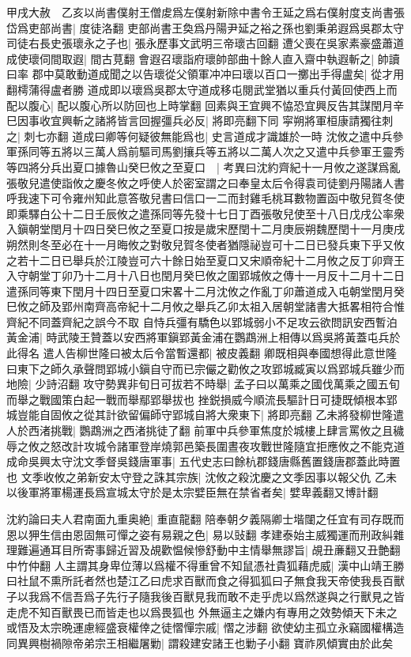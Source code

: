 甲戌大赦　乙亥以尚書僕射王僧䖍爲左僕射新除中書令王延之爲右僕射度支尚書張岱爲吏部尚書|{
	度徒洛翻}
吏部尚書王奐爲丹陽尹延之裕之孫也劉秉弟遐爲吳郡太守司徒右長史張瓌永之子也|{
	張永歷事文武明三帝瓌古回翻}
遭父喪在吳家素豪盛蕭道成使瓌伺間取遐|{
	間古莧翻}
會遐召瓌詣府瓌帥部曲十餘人直入齋中執遐斬之|{
	帥讀曰率}
郡中莫敢動道成聞之以告瓌從父領軍冲冲曰瓌以百口一擲出手得盧矣|{
	從才用翻樗蒲得盧者勝}
道成即以瓌爲吳郡太守道成移屯閱武堂猶以重兵付黃回使西上而配以腹心|{
	配以腹心所以防回也上時掌翻}
回素與王宜興不恊恐宜興反告其謀閏月辛巳因事收宜興斬之諸將皆言回握彊兵必反|{
	將即亮翻下同}
寜朔將軍桓康請獨往刺之|{
	刺七亦翻}
道成曰卿等何疑彼無能爲也|{
	史言道成才識雄於一時}
沈攸之遣中兵參軍孫同等五將以三萬人爲前驅司馬劉攘兵等五將以二萬人次之又遣中兵參軍王靈秀等四將分兵出夏口據魯山癸巳攸之至夏口　|{
	考異曰沈約齊紀十一月攸之遂謀爲亂張敬兒遣使詣攸之慶冬攸之呼使人於密室謂之曰奉皇太后令得袁司徒劉丹陽諸人書呼我速下可令雍州知此意答敬兒書曰信口一二而封雞毛桃耳數物置函中敬兒賀冬使即乘驛白公十二日壬辰攸之遣孫同等先發十七日丁酉張敬兒使至十八日戊戌公率衆入鎭朝堂閏月十四日癸巳攸之至夏口按是歲宋歷閏十二月庚辰朔魏歷閏十一月庚戌朔然則冬至必在十一月晦攸之對敬兒賀冬使者猶隱祕豈可十二日已發兵東下乎又攸之若十二日已舉兵於江陵豈可六十餘日始至夏口又宋順帝紀十二月攸之反丁卯齊王入守朝堂丁卯乃十二月十八日也閏月癸巳攸之圍郢城攸之傳十一月反十二月十二日遣孫同等東下閏月十四日至夏口宋畧十二月沈攸之作亂丁卯蕭道成入屯朝堂閏月癸巳攸之師及郢州南齊高帝紀十二月攸之舉兵乙卯太祖入居朝堂諸書大抵畧相符合惟齊紀不同蓋齊紀之誤今不取}
自恃兵彊有驕色以郢城弱小不足攻云欲問訊安西暫泊黃金浦|{
	時武陵王贊蓋以安西將軍鎭郢黃金浦在鸚鵡洲上相傳以爲吳將黃蓋屯兵於此得名}
遣人告柳世隆曰被太后令當暫還都|{
	被皮義翻}
卿既相與奉國想得此意世隆曰東下之師久承聲問郢城小鎭自守而已宗儼之勸攸之攻郢城臧寅以爲郢城兵雖少而地險|{
	少詩沼翻}
攻守勢異非旬日可拔若不時舉|{
	孟子曰以萬乘之國伐萬乘之國五旬而舉之戰國策白起一戰而舉鄢郢舉拔也}
挫鋭損威今順流長驅計日可捷既傾根本郢城豈能自固攸之從其計欲留偏師守郢城自將大衆東下|{
	將即亮翻}
乙未將發柳世隆遣人於西渚挑戰|{
	鸚鵡洲之西渚挑徒了翻}
前軍中兵參軍焦度於城樓上肆言罵攸之且穢辱之攸之怒改計攻城令諸軍登岸燒郭邑築長圍晝夜攻戰世隆隨宜拒應攸之不能克道成命吳興太守沈文季督吳錢唐軍事|{
	五代史志曰餘杭郡錢唐縣舊置錢唐郡蓋此時置也}
文季收攸之弟新安太守登之誅其宗族|{
	沈攸之殺沈慶之文季因事以報父仇}
乙未以後軍將軍楊運長爲宣城太守於是太宗嬖臣無在禁省者矣|{
	嬖卑義翻又博計翻}


沈約論曰夫人君南面九重奥絶|{
	重直龍翻}
陪奉朝夕義隔卿士堦闥之任宜有司存既而恩以狎生信由恩固無可憚之姿有易親之色|{
	易以䜴翻}
孝建泰始主威獨運而刑政糾雜理難遍通耳目所寄事歸近習及覘歡愠候慘舒動中主情舉無謬旨|{
	覘丑亷翻又丑艶翻中竹仲翻}
人主謂其身卑位薄以爲權不得重曾不知鼠憑社貴狐藉虎威|{
	漢中山靖王勝曰社鼠不熏所託者然也楚江乙曰虎求百獸而食之得狐狐曰子無食我天帝使我長百獸子以我爲不信吾爲子先行子隨我後百獸見我而敢不走乎虎以爲然遂與之行獸見之皆走虎不知百獸畏已而皆走也以爲畏狐也}
外無逼主之嫌内有專用之效勢傾天下未之或悟及太宗晩運慮經盛衰權倖之徒慴憚宗戚|{
	慴之涉翻}
欲使幼主孤立永竊國權構造同異興樹禍隙帝弟宗王相繼屠勦|{
	謂殺建安諸王也勦子小翻}
寶祚夙傾實由於此矣

